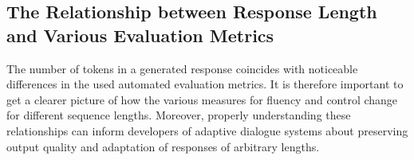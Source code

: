 

\subsection{The Relationship between Response Length and Various Evaluation Metrics}
\label{subsec:ctg_anal_response_length}

The number of tokens in a generated response coincides with noticeable differences in the used automated evaluation metrics. It is therefore important to get a clearer picture of how the various measures for fluency and control change for different sequence lengths. Moreover, properly understanding these relationships can inform developers of adaptive dialogue systems about preserving output quality and adaptation of responses of arbitrary lengths.


